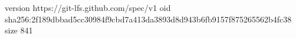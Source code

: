 version https://git-lfs.github.com/spec/v1
oid sha256:2f189dbbad5cc30984f9cbd7a413da3893d8d943b6fb9157f875265562b4fc38
size 841
